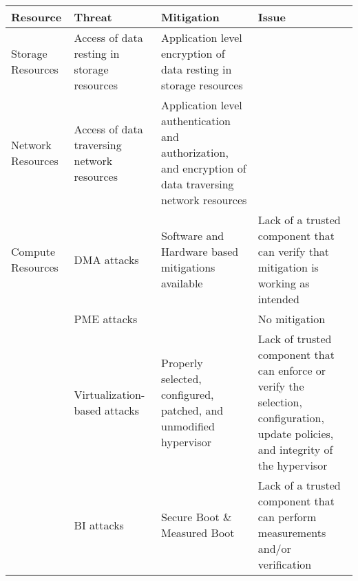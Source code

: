 \begin{tabularx}{\linewidth}{
    | p{8em}
    | >{\raggedright\arraybackslash}X
    | >{\raggedright\arraybackslash}X
    | >{\raggedright\arraybackslash}X
    |
  }
  \hline
  Resource          & Threat                                      & Mitigation                                                                                              & Issue                                                                                                                               \\
  \hline
  \hline
  Storage Resources & Access of data resting in storage resources & Application level encryption of data resting in storage resources                                       &                                                                                                                                     \\
  \hline
  Network Resources & Access of data traversing network resources & Application level authentication and authorization, and encryption of data traversing network resources &                                                                                                                                     \\
  \hline
  Compute Resources & DMA attacks                                 & Software and Hardware based mitigations available                                                       & Lack of a trusted component that can verify that mitigation is working as intended                                                  \\
  \cline{2-4}
                    & PME attacks                                 &                                                                                                         & No mitigation                                                                                                                       \\
  \cline{2-4}
                    & Virtualization-based attacks                & Properly selected, configured, patched, and unmodified hypervisor                                       & Lack of trusted component that can enforce or verify the selection, configuration, update policies, and integrity of the hypervisor \\
  \cline{2-4}
                    & BI attacks                                  & Secure Boot \& \newline Measured Boot                                                                   & Lack of a trusted component that can perform measurements and/or verification                                                       \\
  \hline
\end{tabularx}
